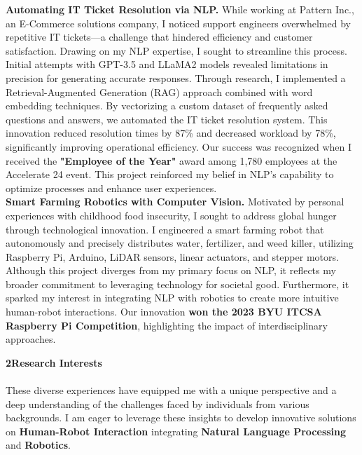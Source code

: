 \documentclass{article}
\begin{document}
\textbf{Automating IT Ticket Resolution via NLP.} While working at Pattern Inc., an E-Commerce solutions company, I noticed support engineers overwhelmed by repetitive IT tickets—a challenge that hindered efficiency and customer satisfaction. Drawing on my NLP expertise, I sought to streamline this process. Initial attempts with GPT-3.5 and LLaMA2 models revealed limitations in precision for generating accurate responses. Through research, I implemented a Retrieval-Augmented Generation (RAG) approach combined with word embedding techniques. By vectorizing a custom dataset of frequently asked questions and answers, we automated the IT ticket resolution system. This innovation reduced resolution times by 87\% and decreased workload by 78\%, significantly improving operational efficiency. Our success was recognized when I received the \textbf{"Employee of the Year"} award among 1,780 employees at the Accelerate 24 event\cite{pattern}. This project reinforced my belief in NLP's capability to optimize processes and enhance user experiences.
\\

\textbf{Smart Farming Robotics with Computer Vision.} Motivated by personal experiences with childhood food insecurity, I sought to address global hunger through technological innovation. I engineered a smart farming robot that autonomously and precisely distributes water, fertilizer, and weed killer, utilizing Raspberry Pi, Arduino, LiDAR sensors, linear actuators, and stepper motors. Although this project diverges from my primary focus on NLP, it reflects my broader commitment to leveraging technology for societal good. Furthermore, it sparked my interest in integrating NLP with robotics to create more intuitive human-robot interactions. Our innovation \textbf{won the 2023 BYU ITCSA Raspberry Pi Competition}, highlighting the impact of interdisciplinary approaches\cite{raspberrypi}.


\Large\textbf{2\hspace{1em}Research Interests}\normalsize
\\
\\
These diverse experiences have equipped me with a unique perspective and a deep understanding of the challenges faced by individuals from various backgrounds. I am eager to leverage these insights to develop innovative solutions on \textbf{Human-Robot Interaction} integrating \textbf{Natural Language Processing} and \textbf{Robotics}. 
\\
\end{document}
